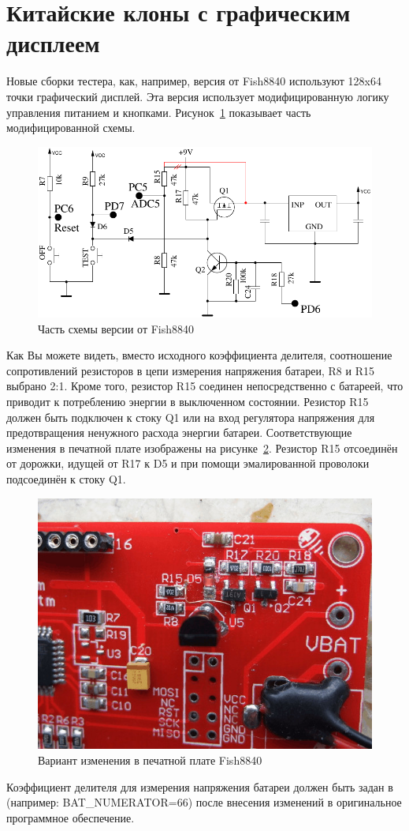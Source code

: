 \section{Китайские клоны с графическим дисплеем}
Новые сборки тестера, как, например, версия от Fish8840 используют 128x64 точки графический дисплей.
Эта версия использует модифицированную логику управления питанием и кнопками. 
Рисунок~\ref{fig:Fish8840} показывает часть модифицированной схемы.
\begin{figure}[H]
\centering
\includegraphics[width=.7\textwidth]{../FIG/Fish8840.pdf}
\caption{Часть схемы версии от Fish8840}
\label{fig:Fish8840}
\end{figure}
Как Вы можете видеть, вместо исходного коэффициента делителя, соотношение сопротивлений резисторов в цепи измерения 
напряжения батареи, R8 и R15 выбрано 2:1.
Кроме того, резистор R15 соединен непосредственно с батареей, что приводит к потреблению энергии в выключенном состоянии. 
Резистор R15 должен быть подключен к стоку Q1 или на вход регулятора напряжения для предотвращения ненужного 
расхода энергии батареи.
Соответствующие изменения в печатной плате изображены на рисунке~\ref{fig:Fish8840patch}.
Резистор R15 отсоединён от дорожки, идущей от R17 к D5 и при помощи эмалированной проволоки подсоединён к стоку Q1.
\begin{figure}[H]
\centering
\includegraphics[width=.7\textwidth]{../PNG/Fish8840patch.jpg}
\caption{Вариант изменения в печатной плате Fish8840}
\label{fig:Fish8840patch}
\end{figure}
Коэффициент делителя для измерения напряжения батареи должен быть задан в  (например: BAT\_NUMERATOR=66) 
после внесения изменений в оригинальное программное обеспечение.

